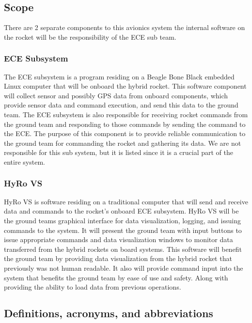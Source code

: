 \documentclass[10pt,draftclsnofoot,onecolumn,compsoc]{IEEEtran}
\begin{document}
\subsection{Scope}
 There are 2 separate components to this avionics system the internal software on the rocket will be the responsibility of the ECE sub team.

\subsubsection{ECE Subsystem}
The ECE subsystem is a program residing on a Beagle Bone Black embedded Linux computer that will be onboard the hybrid rocket. This software component will collect sensor and possibly GPS data from onboard components, which provide sensor data and command execution, and send this data to the ground team. The ECE subsystem is also responsible for receiving rocket commands from the ground team and responding to those commands by sending the command to the ECE. The purpose of this component is to provide reliable communication to the ground team for commanding the rocket and gathering its data. We are not responsible for this sub system, but it is listed since it is a crucial part of the entire system.  \par

\subsubsection{HyRo VS}
HyRo VS is software residing on a traditional computer that will send and receive data and commands to the rocket's onboard ECE subsystem. HyRo VS will be the ground teams graphical interface for data visualization, logging, and issuing commands to the system. It will present the ground team with input buttons to issue appropriate commands and data visualization windows to monitor data transferred from the hybrid rockets on board systems. This software will benefit the ground team by providing data visualization from the hybrid rocket that previously was not human readable. It also will provide command input into the system that benefits the ground team by ease of use and safety. Along with providing the ability to load data from previous operations.

\subsection{Definitions, acronyms, and abbreviations}
\end{document}
